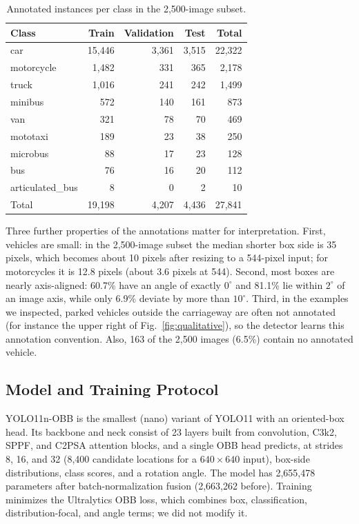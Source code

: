 \documentclass[runningheads]{llncs}
\begin{document}
\begin{table}
\caption{Annotated instances per class in the 2,500-image subset.}
\label{tab:classdist}
\centering
\small
\begin{tabular}{lrrrr}
\toprule
Class & Train & Validation & Test & Total \\
\midrule
car & 15{,}446 & 3{,}361 & 3{,}515 & 22{,}322 \\
motorcycle & 1{,}482 & 331 & 365 & 2{,}178 \\
truck & 1{,}016 & 241 & 242 & 1{,}499 \\
minibus & 572 & 140 & 161 & 873 \\
van & 321 & 78 & 70 & 469 \\
mototaxi & 189 & 23 & 38 & 250 \\
microbus & 88 & 17 & 23 & 128 \\
bus & 76 & 16 & 20 & 112 \\
articulated\_bus & 8 & 0 & 2 & 10 \\
\midrule
Total & 19{,}198 & 4{,}207 & 4{,}436 & 27{,}841 \\
\bottomrule
\end{tabular}
\end{table}

Three further properties of the annotations matter for interpretation. First,
vehicles are small: in the 2,500-image subset the median shorter box side is
35 pixels, which becomes about 10 pixels after resizing to a 544-pixel input;
for motorcycles it is 12.8 pixels (about 3.6 pixels at 544). Second, most boxes
are nearly axis-aligned: 60.7\% have an angle of exactly $0^\circ$ and 81.1\%
lie within $2^\circ$ of an image axis, while only 6.9\% deviate by more than
$10^\circ$. Third, in the examples we inspected, parked vehicles outside the
carriageway are often not annotated (for instance the upper right of
Fig.~\ref{fig:qualitative}), so the detector learns this annotation convention.
Also, 163 of the 2,500 images (6.5\%) contain no annotated vehicle.

\subsection{Model and Training Protocol}

YOLO11n-OBB is the smallest (nano) variant of YOLO11 with an oriented-box head.
Its backbone and neck consist of 23 layers built from convolution, C3k2,
SPPF, and C2PSA attention blocks, and a single OBB head predicts, at strides 8,
16, and 32 (8,400 candidate locations for a $640\times640$ input), box-side
distributions, class scores, and a rotation angle. The model has 2,655,478
parameters after batch-normalization fusion (2,663,262 before). Training
minimizes the Ultralytics OBB loss, which combines box, classification,
distribution-focal, and angle terms; we did not modify it.
\end{document}
